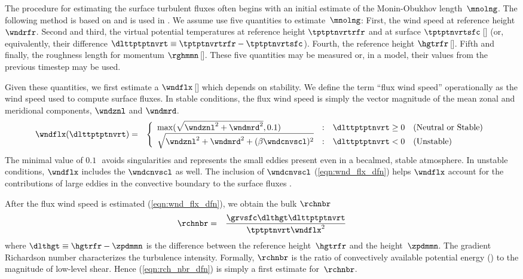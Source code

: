 \documentclass[12pt,twoside]{book}
\begin{document}
The procedure for estimating the surface turbulent fluxes often begins
with an initial estimate of the Monin-Obukhov length~$\mnolng$.
The following method is based on \cite{ZZD98} and is used in
 \cite[][]{DZD03}.
We assume use five quantities to estimate~$\mnolng$:
First, the wind speed at reference height $\wndrfr$.
Second and third, the virtual potential temperatures at reference
height $\tptptnvrtrfr$ and at surface $\tptptnvrtsfc$\,[\K] (or,
equivalently, their difference 
$\dlttptptnvrt \equiv \tptptnvrtrfr-\tptptnvrtsfc$).
Fourth, the reference height $\hgtrfr$\,[\m].
Fifth and finally, the roughness length for momentum $\rghmmn$\,[\m]. 
These five quantities may be measured or, in a model, their values
from the previous timestep may be used.

Given these quantities, we first estimate a 
$\wndflx$\,[\mxs] which depends on stability.
We define the term ``flux wind speed'' operationally as the wind speed
used to compute surface fluxes.
In stable conditions, the flux wind speed is simply the vector
magnitude of the mean zonal and meridional components, $\wndznl$
and $\wndmrd$. 
\begin{eqnarray}
\wndflx(\dlttptptnvrt) & = & \left\{
\begin{array}{l@{\quad:\quad}l}
\max(\sqrt{\wndznl^{2}+\wndmrd^{2}},0.1) & \dlttptptnvrt \ge 0 
\quad \mbox{(Neutral or Stable)} \\
\sqrt{\wndznl^{2}+\wndmrd^{2}+(\beta\wndcnvscl)^{2}} & \dlttptptnvrt <
0 \quad \mbox{(Unstable)}
\end{array} \right.
\label{eqn:wnd_flx_dfn}
\end{eqnarray}
The minimal value of $0.1$\,\mxs\ avoids singularities and represents
the small eddies present even in a becalmed, stable atmosphere.
In unstable conditions, $\wndflx$ includes the 
 $\wndcnvscl$ as well. 
The inclusion of $\wndcnvscl$ (\ref{eqn:wnd_flx_dfn}) helps 
$\wndflx$ account for the contributions of large eddies in the
convective boundary to the surface fluxes \cite[][]{ZZD98}. 

After the flux wind speed is estimated (\ref{eqn:wnd_flx_dfn}), 
we obtain the bulk  $\rchnbr$ 
\begin{eqnarray}
\label{eqn:rch_nbr_dfn}
\rchnbr & = & \frac{\grvsfc\dlthgt\dlttptptnvrt}{\tptptnvrt\wndflx^{2}}
\end{eqnarray}
where $\dlthgt \equiv \hgtrfr-\zpdmmn$ is the difference between
the reference height~$\hgtrfr$ and the  height~$\zpdmmn$.
The gradient Richardson number characterizes the turbulence intensity.
Formally, $\rchnbr$ is the ratio of convectively available potential 
energy () to the magnitude of low-level shear. 
Hence (\ref{eqn:rch_nbr_dfn}) is simply a first estimate
for~$\rchnbr$. 
\end{document}
